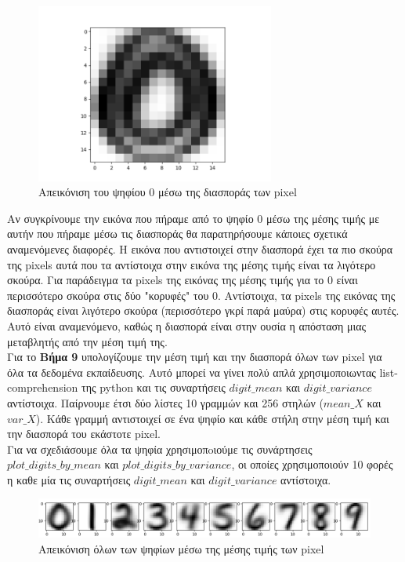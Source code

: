 \documentclass[11pt]{article} %
\begin{document}
\begin{figure}[H]
    \centering
    \includegraphics[width=0.7\textwidth]{plots/variance_0}
    \caption{Απεικόνιση του ψηφίου $0$ μέσω της διασποράς των pixel}
    \label{fig:var_0}
\end{figure}



Αν συγκρίνουμε την εικόνα που πήραμε από το ψηφίο 0 μέσω της μέσης τιμής με αυτήν που πήραμε μέσω τις διασποράς θα παρατηρήσουμε κάποιες σχετικά αναμενόμενες διαφορές. Η εικόνα που αντιστοιχεί στην διασπορά έχει τα πιο σκούρα της pixels αυτά που τα αντίστοιχα στην εικόνα της μέσης τιμής είναι τα λιγότερο σκούρα. Για παράδειγμα τα pixels της εικόνας της μέσης τιμής για το $0$ είναι περισσότερο σκούρα στις δύο "κορυφές" του $0$. Αντίστοιχα, τα pixels της εικόνας της διασποράς είναι λιγότερο σκούρα (περισσότερο γκρί παρά μαύρα) στις κορυφές αυτές. Αυτό είναι αναμενόμενο, καθώς η διασπορά είναι στην ουσία η απόσταση μιας μεταβλητής από την μέση τιμή της. \\

Για το \textbf{Βήμα 9} υπολογίζουμε την μέση τιμή και την διασπορά όλων των pixel για όλα τα δεδομένα εκπαίδευσης. Αυτό μπορεί να γίνει πολύ απλά χρησιμοποιωντας list-comprehension της python και τις συναρτήσεις $digit\_mean$ και $digit\_variance$ αντίστοιχα. Παίρνουμε έτσι δύο λίστες 10 γραμμών και 256 στηλών ($mean\_X$ και $var\_X$). Κάθε γραμμή αντιστοιχεί σε ένα ψηφίο και κάθε στήλη στην μέση τιμή και την διασπορά του εκάστοτε pixel. \\

Για να σχεδιάσουμε όλα τα ψηφία χρησιμοπoιούμε τις συνάρτησεις  $plot\_digits\_by\_mean$ και $plot\_digits\_by\_variance$, οι οποίες χρησιμοποιούν 10 φορές η καθε μία τις συναρτήσεις $digit\_mean$ και $digit\_variance$ αντίστοιχα. 

\begin{figure}[H]
    \centering
    \includegraphics[width=1.1\textwidth]{plots/all_digits_mean}
    \caption{Απεικόνιση όλων των ψηφίων μέσω της μέσης τιμής των pixel}
    \label{fig:all_mean}
\end{figure}
\end{document}
